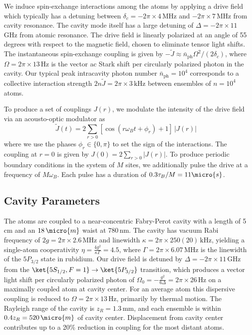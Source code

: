 \documentclass[aps,pra,twocolumn,superscriptaddress]{revtex4-1} %
\begin{document}
\begin{bibunit}

We induce spin-exchange interactions among the atoms by applying a drive field which typically has a detuning between $\delta_c = -2\pi\times 4\,\text{MHz}$ and $-2\pi\times7\,$MHz from cavity resonance. The cavity mode itself has a large detuning of $\Delta = -2\pi\times 11\,$GHz from atomic resonance. The drive field is linearly polarized at an angle of 55 degrees with respect to the magnetic field, chosen to eliminate tensor light shifts. The instantaneous spin-exchange coupling is given by $-\tilde{J} \approx \bar{n}_\text{ph}\Omega^2/(2\delta_c)$, where $\Omega = 2\pi \times 13\,\text{Hz}$ is the vector ac Stark shift per circularly polarized photon in the cavity.  Our typical peak intracavity photon number $\bar{n}_\text{ph} = 10^4$ corresponds to a collective interaction strength $2n\tilde{J} = 2\pi\times 3\,\text{kHz}$ between ensembles of $n=10^4$ atoms.

To produce a set of couplings $J(r)$, we modulate the intensity of the drive field via an acousto-optic modulator as 
\begin{equation}
\tilde{J}(t)  =  2\sum_{r>0} \left[\cos(r \omega_B t+\phi_r)+1\right]\, |J(r)|
\end{equation}
where we use the phases $\phi_r \in \{0,\pi\}$ to set the sign of the interactions. The coupling at $r = 0$ is given by $J(0) = 2\sum_{r>0} |J(r)|$.
To produce periodic boundary conditions in the system of $M$ sites, we additionally pulse the drive at a frequency of $M\omega_B$. Each pulse has a duration of $0.3 \tau_B/M = 11\micro{s}$.

\subsection{Cavity Parameters}

The atoms are coupled to a near-concentric Fabry-Perot cavity with a length of 5\, cm and an $18\,\micro{m}$ waist at 780\,nm.  The cavity has vacuum Rabi frequency of $2g = 2\pi \times 2.6 \,\text{MHz}$ and linewidth $\kappa = 2\pi\times 250(20)\,\text{kHz}$, yielding a single-atom cooperativity $\eta = \frac{4g^2}{\kappa\Gamma} = 4.5$, where $\Gamma = 2\pi \times 6.07 \,\text{MHz}$ is the linewidth of the $5P_{3/2}$ state in rubidium.  Our drive field is detuned by $\Delta =- 2\pi \times 11 \,\text{GHz}$ from the $\ket{5S_{1/2}, F=1} \rightarrow \ket{5P_{3/2}}$ transition, which produces a vector light shift per circularly polarized photon of $\Omega_0 = -\frac{g^2}{6\Delta} = 2\pi\times26\,\text{Hz}$ on a maximally coupled atom at cavity center. For an average atom this dispersive coupling is reduced to $\Omega = 2\pi\times 13\,\text{Hz}$, primarily by thermal motion. The Rayleigh range of the cavity is $z_R = 1.3\,\text{mm}$, and each ensemble is within $0.4 z_R= 520\,\micro{m}$ of cavity center.  Displacement from cavity center contributes up to a 20\% reduction in coupling for the most distant atoms.


\end{bibunit}
\end{document}
